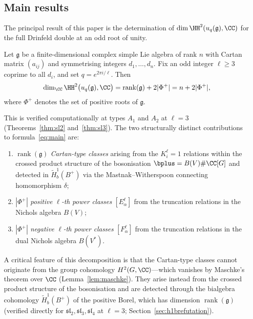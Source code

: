 \subsection{Main results}

The principal result of this paper is the determination of $\dim \HH^2(u_q(\mathfrak{g}), \CC)$ for the full Drinfeld double at an odd root of unity.

\begin{theorem}
\label{thm:main}
Let $\mathfrak{g}$ be a finite-dimensional complex simple Lie algebra of rank $n$ with Cartan matrix $(a_{ij})$ and symmetrising integers $d_1, \ldots, d_n$. Fix an odd integer $\ell \geq 3$ coprime to all $d_i$, and set $q = e^{2\pi i/\ell}$. Then
\begin{equation}
\label{eq:main}
\dim_\CC \HH^2\bigl(u_q(\mathfrak{g}), \CC\bigr) = \operatorname{rank}(\mathfrak{g}) + 2|\Phi^+| = n + 2|\Phi^+|,
\end{equation}
where $\Phi^+$ denotes the set of positive roots of $\mathfrak{g}$.
\end{theorem}

\noindent
This is verified computationally at types $A_1$ and $A_2$ at $\ell = 3$ (Theorems~\ref{thm:sl2} and~\ref{thm:sl3}). The two structurally distinct contributions to formula~\eqref{eq:main} are:
\begin{enumerate}[label=(\roman*)]
\item $\operatorname{rank}(\mathfrak{g})$ \emph{Cartan-type classes} arising from the $K_i^\ell = 1$ relations within the crossed product structure of the bosonisation $\bplus = B(V) \# \CC[G]$ and detected in $\tilde{H}^1_b(B^+)$ via the Mastnak--Witherspoon connecting homomorphism $\delta$;
\item $|\Phi^+|$ \emph{positive $\ell$-th power classes} $[E_\alpha^\ell]$ from the truncation relations in the Nichols algebra $B(V)$;
\item $|\Phi^+|$ \emph{negative $\ell$-th power classes} $[F_\alpha^\ell]$ from the truncation relations in the dual Nichols algebra $B(V^*)$.
\end{enumerate}
A critical feature of this decomposition is that the Cartan-type classes cannot originate from the group cohomology $H^2(G, \CC)$---which vanishes by Maschke's theorem over $\CC$ (Lemma~\ref{lem:maschke}). They arise instead from the crossed product structure of the bosonisation and are detected through the bialgebra cohomology $\tilde{H}^1_b(B^+)$ of the positive Borel, which has dimension $\operatorname{rank}(\mathfrak{g})$ (verified directly for $\mathfrak{sl}_2, \mathfrak{sl}_3, \mathfrak{sl}_4$ at $\ell = 3$; Section~\ref{sec:h1brefutation}).

